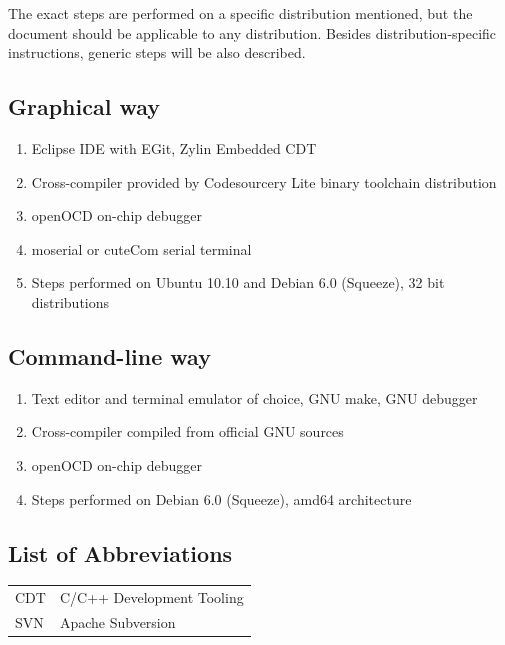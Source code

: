 \documentclass[a4paper, 10pt]{article}
\begin{document}
The exact steps are performed on a specific distribution mentioned, but the
document should be applicable to any distribution. Besides distribution-specific
instructions, generic steps will be also described.

\subsection{Graphical way}

\begin{enumerate}
\item Eclipse IDE with EGit, Zylin Embedded CDT
\item Cross-compiler provided by Codesourcery Lite binary toolchain
	distribution
\item openOCD on-chip debugger
\item moserial or cuteCom serial terminal
\item Steps performed on Ubuntu 10.10 and Debian 6.0 (Squeeze),
	32 bit distributions
\end{enumerate}

\subsection{Command-line way}

\begin{enumerate}
\item Text editor and terminal emulator of choice, GNU make, GNU debugger
\item Cross-compiler compiled from official GNU sources
\item openOCD on-chip debugger
\item Steps performed on Debian 6.0 (Squeeze), amd64 architecture
\end{enumerate}

\newpage

\tableofcontents
\newpage

\listoffigures
\newpage

\subsection*{List of Abbreviations}
	\begin{tabular}{ l l }
    CDT	    & C/C++ Development Tooling \\
    SVN     & Apache Subversion \\
	\end{tabular}
\newpage
\end{document}
